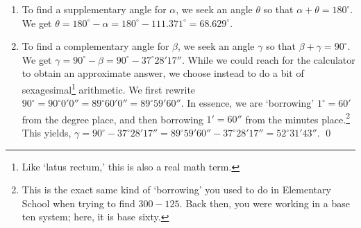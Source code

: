 \documentclass{ximera}
\begin{document}
\begin{example}
\begin{enumerate}
\begin{image}
\end{image}

\item  To find a supplementary angle for $\alpha$, we seek an angle $\theta$ so that $\alpha + \theta = 180^{\circ}$.  We get $\theta = 180^{\circ} - \alpha =  180^{\circ} - 111.371^{\circ} = 68.629^{\circ}$.

\item  To find a complementary  angle for $\beta$, we seek an angle $\gamma$ so that $\beta + \gamma = 90^{\circ}$.  We get $\gamma = 90^{\circ} - \beta =  90^{\circ} - 37^{\circ}28'17''$.  While we could reach for the calculator to obtain an approximate answer, we choose instead to do a bit of sexagesimal\footnote{Like `latus rectum,' this is also a real math term.} arithmetic.  We first rewrite  $90^{\circ} = 90^{\circ} 0' 0'' =  89^{\circ}60' 0'' =  89^{\circ}59'60''$. In essence, we are `borrowing' $1^{\circ} = 60'$ from the degree place,  and then borrowing $1' = 60''$ from the minutes place.\footnote{This is the exact same kind of `borrowing' you used to do in Elementary School when trying to find $300 - 125$. Back then, you were working in a base ten system;  here, it is base sixty.} This yields, $\gamma = 90^{\circ} - 37^{\circ}28'17'' = 89^{\circ}59'60'' - 37^{\circ}28'17'' = 52^{\circ}31'43''$.  \qed

\end{enumerate}

\end{example} 
\end{document}
